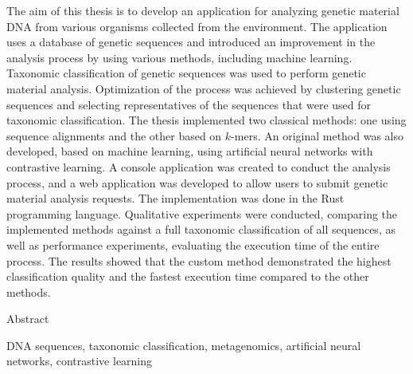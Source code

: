 \cleardoublepage{}

\secondabstract{}
The aim of this thesis is to develop an application for analyzing genetic material DNA from various organisms collected from the environment. The application uses a database of genetic sequences and introduced an improvement in the analysis process by using various methods, including machine learning.
Taxonomic classification of genetic sequences was used to perform genetic material analysis. Optimization of the process was achieved by clustering genetic sequences and selecting representatives of the sequences that were used for taxonomic classification. The thesis implemented two classical methods: one using sequence alignments and the other based on $k$-mers. An original method was also developed, based on machine learning, using artificial neural networks with contrastive learning. A console application was created to conduct the analysis process, and a web application was developed to allow users to submit genetic material analysis requests. The implementation was done in the Rust programming language.
Qualitative experiments were conducted, comparing the implemented methods against a full taxonomic classification of all sequences, as well as performance experiments, evaluating the execution time of the entire process. The results showed that the custom method demonstrated the highest classification quality and the fastest execution time compared to the other methods.

Abstract

\secondkeywords{}
DNA sequences, taxonomic classification,  metagenomics, artificial neural networks, contrastive learning
